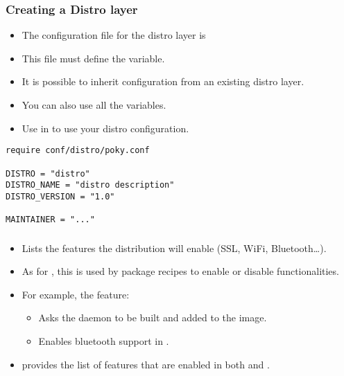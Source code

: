 \begin{frame}[fragile]
  \frametitle{Creating a Distro layer}
  \begin{itemize}
    \item The configuration file for the distro layer is
    \item This file must define the  variable.
    \item It is possible to inherit configuration from an existing
      distro layer.
    \item You can also use all the  variables.
    \item Use  in  to use
      your distro configuration.
  \end{itemize}
  \begin{block}{}
    \begin{verbatim}
require conf/distro/poky.conf

DISTRO = "distro"
DISTRO_NAME = "distro description"
DISTRO_VERSION = "1.0"

MAINTAINER = "..."
    \end{verbatim}
  \end{block}
\end{frame}

\begin{frame}
  \frametitle{}
  \begin{itemize}
    \item Lists the features the distribution will enable (SSL, WiFi,
          Bluetooth\dots).
    \item As for , this is used by package
      recipes to enable or disable functionalities.
    \item For example, the  feature:
      \begin{itemize}
        \item Asks the  daemon to be built and added to
          the image.
        \item Enables bluetooth support in .
      \end{itemize}
    \item {} provides the list of features that
      are enabled in both  and .
  \end{itemize}
\end{frame}


